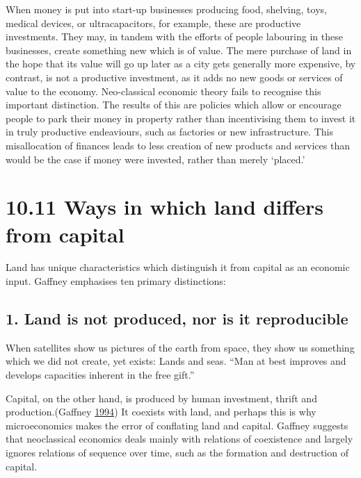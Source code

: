\documentclass[]{tufte-handout}
\begin{document}
When money is put into start-up businesses producing food, shelving,
toys, medical devices, or ultracapacitors, for example, these are
productive investments. They may, in tandem with the efforts of people
labouring in these businesses, create something new which is of value.
The mere purchase of land in the hope that its value will go up later as
a city gets generally more expensive, by contrast, is not a productive
investment, as it adds no new goods or services of value to the economy.
Neo-classical economic theory fails to recognise this important
distinction. The results of this are policies which allow or encourage
people to park their money in property rather than incentivising them to
invest it in truly productive endeaviours, such as factories or new
infrastructure. This misallocation of finances leads to less creation of
new products and services than would be the case if money were invested,
rather than merely `placed.'

\hypertarget{ways-in-which-land-differs-from-capital}{%
\section{10.11 Ways in which land differs from
capital}\label{ways-in-which-land-differs-from-capital}}

Land has unique characteristics which distinguish it from capital as an
economic input. Gaffney emphasises ten primary distinctions:

\hypertarget{land-is-not-produced-nor-is-it-reproducible}{%
\subsection{1. Land is not produced, nor is it
reproducible}\label{land-is-not-produced-nor-is-it-reproducible}}

When satellites show us pictures of the earth from space, they show us
something which we did not create, yet exists: Lands and seas. ``Man at
best improves and develops capacities inherent in the free gift.''

Capital, on the other hand, is produced by human investment, thrift and
production.(Gaffney \protect\hyperlink{ref-Gaffney1994}{1994}) It
coexists with land, and perhaps this is why microeconomics makes the
error of conflating land and capital. Gaffney suggests that neoclassical
economics deals mainly with relations of coexistence and largely ignores
relations of sequence over time, such as the formation and destruction
of capital.
\end{document}
